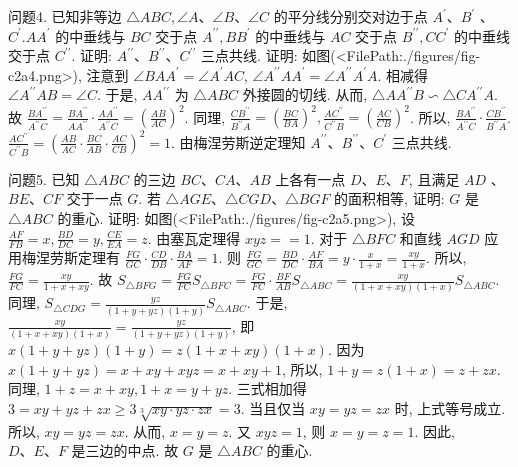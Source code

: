 问题4. 已知非等边 $\triangle A B C, \angle A 、 \angle B 、 \angle C$ 的平分线分别交对边于点 $A^{\prime} 、 B^{\prime}$ 、 $C^{\prime} . A A^{\prime}$ 的中垂线与 $B C$ 交于点 $A^{\prime \prime}, B B^{\prime}$ 的中垂线与 $A C$ 交于点 $B^{\prime \prime}, C C^{\prime}$ 的中垂线交于点 $C^{\prime \prime}$. 证明: $A^{\prime \prime} 、 B^{\prime \prime} 、 C^{\prime \prime}$ 三点共线.
证明: 如图(<FilePath:./figures/fig-c2a4.png>), 注意到 $\angle B A A^{\prime}=\angle A^{\prime} A C$, $\angle A^{\prime \prime} A A^{\prime}=\angle A^{\prime \prime} A^{\prime} A$. 相减得 $\angle A^{\prime \prime} A B=\angle C$. 于是, $A A^{\prime \prime}$ 为 $\triangle A B C$ 外接圆的切线.
从而, $\triangle A A^{\prime \prime} B \backsim \triangle C A^{\prime \prime} A$. 故 $\frac{B A^{\prime \prime}}{A^{\prime \prime} C}=\frac{B A^{\prime \prime}}{A A^{\prime \prime}} \cdot \frac{A A^{\prime \prime}}{A^{\prime \prime} C}=\left(\frac{A B}{A C}\right)^2$. 同理, $\frac{C B^{\prime \prime}}{B^{\prime \prime} A}=\left(\frac{B C}{B A}\right)^2, \frac{A C^{\prime \prime}}{C^{\prime \prime} B}=\left(\frac{A C}{C B}\right)^2$. 所以, $\frac{B A^{\prime \prime}}{A^{\prime \prime} C} \cdot \frac{C B^{\prime \prime}}{B^{\prime \prime} A}$.
$\frac{A C^{\prime \prime}}{C^{\prime \prime} B}=\left(\frac{A B}{A C} \cdot \frac{B C}{A B} \cdot \frac{A C}{C B}\right)^2=1$. 由梅涅劳斯逆定理知 $A^{\prime \prime} 、 B^{\prime \prime} 、 C^{\prime}$ 三点共线.



问题5. 已知 $\triangle A B C$ 的三边 $B C 、 C A 、 A B$ 上各有一点 $D 、 E 、 F$, 且满足 $A D$ 、 $B E 、 C F$ 交于一点 $G$. 若 $\triangle A G E 、 \triangle C G D 、 \triangle B G F$ 的面积相等, 证明: $G$ 是 $\triangle A B C$ 的重心.
证明: 如图(<FilePath:./figures/fig-c2a5.png>), 设 $\frac{A F}{F B}=x, \frac{B D}{D C}=y, \frac{C E}{E A}=z$. 由塞瓦定理得 $x y z==1$. 对于 $\triangle B F C$ 和直线 $A G D$ 应用梅涅劳斯定理有 $\frac{F G}{G C} \cdot \frac{C D}{D B} \cdot \frac{B A}{A F}=1$. 则 $\frac{F G}{G C}=\frac{B D}{D C} \cdot \frac{A F}{B A}= y \cdot \frac{x}{1+x}=\frac{x y}{1+x}$. 所以, $\frac{F G}{F C}=\frac{x y}{1+x+x y}$. 故 $S_{\triangle B F G}= \frac{F G}{F C} S_{\triangle B F C}=\frac{F G}{F C} \cdot \frac{B F}{A B} S_{\triangle A B C}=\frac{x y}{(1+x+x y)(1+x)} S_{\triangle A B C}$.
同理, $S_{\triangle C D G}=\frac{y z}{(1+y+y z)(1+y)} S_{\triangle A B C}$. 于是, $\frac{x y}{(1+x+x y)(1+x)}= \frac{y z}{(1+y+y z)(1+y)}$, 即 $x(1+y+y z)(1+y)=z(1+x+x y)(1+x)$. 因为 $x(1+y+y z)=x+x y+x y z=x+x y+1$, 所以, $1+y=z(1+x)=z+ z x$. 同理, $1+z=x+x y, 1+x=y+y z$. 三式相加得 $3=x y+y z+z x \geqslant 3 \sqrt[3]{x y \cdot y z \cdot z x}=3$. 当且仅当 $x y=y z=z x$ 时, 上式等号成立.
所以, $x y= y z=z x$. 从而, $x=y=z$. 又 $x y z=1$, 则 $x=y=z=1$. 因此, $D 、 E 、 F$ 是三边的中点.
故 $G$ 是 $\triangle A B C$ 的重心.




